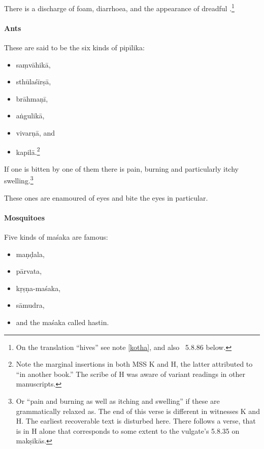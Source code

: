 \begin{translation}
There is a discharge of foam, diarrhoea, and the appearance of 
dreadful .\footnote{On the translation “hives” see
    note \ref{kotha}, and also \SS\ 5.8.86 below.} 
    
    \paragraph{Ants}
    
    These are said to be the six kinds of \gls{pipīlika}: 
    \begin{itemize}
        \item \Gls{saṃvāhikā}, 
        \item \Gls{sthūlaśīrṣā}, 
        \item \Gls{brāhmaṇī}, 
        \item \Gls{aṅgulikā},
        \item \Gls{vivarṇā}, and 
        \item \Gls{kapilā}.\footnote{Note the marginal insertions in both
            MSS K and H, the latter attributed to  “in another
            book.” The scribe of H was aware of variant readings in other
            manuscripts. }    
    \end{itemize}
If one is bitten by one of them there is pain, burning and particularly 
itchy swelling.\footnote{Or “pain and burning as well as itching
        and swelling” if these are grammatically relaxed as. The end of
        this verse is different in witnesses K and H.  The earliest
        recoverable text is disturbed here.  There follows a verse, 
         that is in H alone that corresponds to some extent to 
        the vulgate's 5.8.35 on \glspl{makṣikā}.}
        
These ones are enamoured of eyes and bite the eyes in particular.
    
    \paragraph{Mosquitoes}
    
\item[36 verses 1--3]

Five kinds of \gls{maśaka} are famous:
\begin{itemize}
    \item \Gls{maṇḍala},
    \item \Gls{pārvata},
    \item \Gls{kṛṣṇa-maśaka},
    \item \Gls{sāmudra}, 
    \item and the \gls{maśaka} called \Gls{hastin}.
\end{itemize}


\end{translation}
